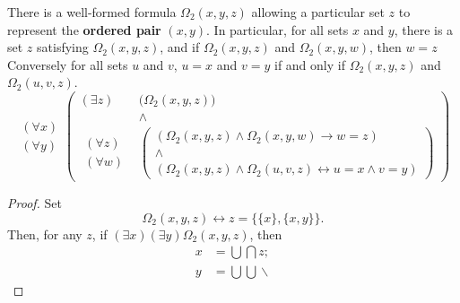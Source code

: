 \documentclass[letterpaper]{article}
\begin{document}
\begin{theorem}
	There is a well-formed formula $\Omega_2(x,y,z)$ allowing a particular set $z$ to represent the \textbf{ordered pair} $(x,y)$.  In particular, for all sets $x$ and $y$, there is a set $z$ satisfying $\Omega_2(x,y,z)$, and if $\Omega_2(x,y,z)$ and $\Omega_2(x,y,w)$, then $w=z$  Conversely for all sets $u$ and $v$, $u=x$ and $v=y$ if and only if $\Omega_2(x,y,z)$ and $\Omega_2(u,v,z)$.
	\begin{equation}
		\begin{array}{r}(\forall x)\\(\forall y)\end{array}
		\left(\begin{array}{rl}
			(\exists z)&\big(\Omega_2(x,y,z)\big)\\
			&\land\\
			\begin{array}{r}(\forall z)\\(\forall w)\end{array}&
				\left(\begin{array}{c}(\Omega_2(x,y,z)\land\Omega_2(x,y,w)\longrightarrow w=z)\\
			\land\\
			(\Omega_2(x,y,z)\land\Omega_2(u,v,z)\longleftrightarrow u=x		
			\land v=y)\end{array}\right)
		\end{array}\right)
	\end{equation}
\end{theorem}
\begin{proof}
Set
	\begin{equation}
		\Omega_2(x,y,z) \longleftrightarrow z=\big\{\{x\},\{x,y\}\big\}.
	\end{equation}
Then, for any $z$, if $(\exists x)(\exists y)\Omega_2(x,y,z)$, then
	\begin{align}
		x &= \bigcup \bigcap z;\\
		y &= \bigcup \bigcup \operatorname{\backslash} 
	\end{align}
\end{proof}
\end{document}

